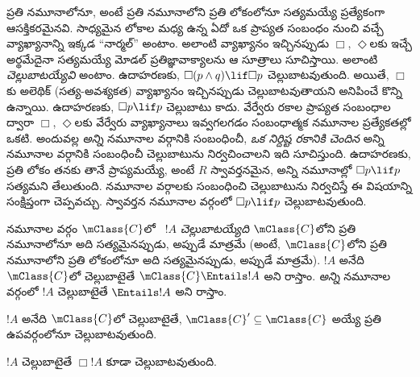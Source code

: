 \documentclass[../../../include/open-logic-section]{subfiles}
\begin{document}


\begin{explain}
  ప్రతి నమూనాలోనూ, అంటే ప్రతి నమూనాలోని ప్రతి లోకంలోనూ
  సత్యమయ్యే  ప్రత్యేకంగా ఆసక్తికరమైనవి.
  సాధ్యమైన లోకాల మధ్య ఉన్న ఏదో ఒక ప్రాప్యత సంబంధం నుంచి వచ్చే
  వ్యాఖ్యానాన్ని ఇక్కడ “నార్మల్” అంటాం. అలాంటి వ్యాఖ్యానం ఇచ్చినప్పుడు
  $\Box$, $\Diamond$లకు ఇచ్చే అర్థమేదైనా సత్యమయ్యే
  మోడల్ ప్రతిజ్ఞావాక్యాలను ఆ సూత్రాలు సూచిస్తాయి. అలాంటి
   \emph{చెల్లుబాటయ్యేవి}
  అంటాం. ఉదాహరణకు, $\Box(p \land q) \lif \Box p$
  చెల్లుబాటవుతుంది. అయితే, $\Box$కు అలెథిక్ (సత్య-అవశ్యకత)
  వ్యాఖ్యానం ఇచ్చినప్పుడు చెల్లుబాటవుతాయని అనిపించే కొన్ని
   ఉన్నాయి. ఉదాహరణకు,
  $\Box p \lif p$ చెల్లుబాటు కాదు. వేర్వేరు రకాల ప్రాప్యత
  సంబంధాల ద్వారా $\Box$, $\Diamond$లకు వేర్వేరు వ్యాఖ్యానాలు
  ఇవ్వగలగడం సంబంధాత్మక నమూనాల ప్రత్యేకతల్లో ఒకటి. అందువల్ల
  \emph{అన్ని} నమూనాల వర్గానికి సంబంధించీ,
  \emph{ఒక నిర్దిష్ట రకానికి చెందిన} అన్ని నమూనాల వర్గానికి
  సంబంధించీ చెల్లుబాటును నిర్వచించాలని ఇది సూచిస్తుంది. ఉదాహరణకు, ప్రతి లోకం తనకు తానే
  ప్రాప్యమయ్యే, అంటే $R$ స్వావర్తనమైన, అన్ని నమూనాల్లో
  $\Box p \lif p$ సత్యమని తేలుతుంది. నమూనాల వర్గాలకు
  సంబంధించి చెల్లుబాటును నిర్వచిస్తే ఈ విషయాన్ని సంక్షిప్తంగా
  చెప్పవచ్చు. స్వావర్తన నమూనాల వర్గంలో $\Box p \lif p$
  చెల్లుబాటవుతుంది.
\end{explain}

\begin{defn}
  నమూనాల వర్గం $\mClass{C}$లో ~$!A$
  \emph{చెల్లుబాటయ్యేది} $\mClass{C}$లోని ప్రతి నమూనాలోనూ అది
  సత్యమైనప్పుడు, అప్పుడే మాత్రమే (అంటే, $\mClass{C}$లోని ప్రతి నమూనాలోని
  ప్రతి లోకంలోనూ అది సత్యమైనప్పుడు, అప్పుడే మాత్రమే). $!A$ అనేది $\mClass{C}$లో
  చెల్లుబాటైతే $\mClass{C} \Entails !A$ అని రాస్తాం.
  \emph{అన్ని} నమూనాల వర్గంలో $!A$ చెల్లుబాటైతే
  $\Entails !A$ అని రాస్తాం.
\end{defn}

\begin{prop}
  $!A$ అనేది $\mClass{C}$లో చెల్లుబాటైతే,
  $\mClass{C}' \subseteq \mClass{C}$ అయ్యే ప్రతి
  ఉపవర్గంలోనూ చెల్లుబాటవుతుంది.
\end{prop}

\begin{prop}
  $!A$ చెల్లుబాటైతే $\Box!A$ కూడా చెల్లుబాటవుతుంది.
\end{prop}
\end{document}
